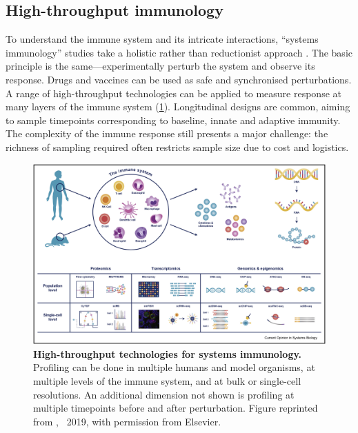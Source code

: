 \begin{outline}
\subsection{High-throughput immunology}

To understand the immune system and its intricate interactions,
\enquote{systems immunology} studies take a holistic rather than reductionist approach \autocite{davis2017SystemsImmunologyJust,villani2018SystemsImmunologyLearning,pulendran2020ScienceMedicineHuman}.
The basic principle is the same---experimentally perturb the system and observe its response.
Drugs and vaccines can be used as safe and synchronised perturbations.
A range of high-throughput technologies can be applied to measure response at many layers of the immune system (\cref{fig:intro_sysImmunology}).
Longitudinal designs are common, aiming to sample timepoints corresponding to baseline, innate and adaptive immunity.
The complexity of the immune response still presents a major challenge:
the richness of sampling required often restricts sample size due to cost and logistics.

\begin{figure}
    \centering
    \includegraphics[width=1.0\textwidth,page=1]{mainmatter/figures/chapter_01/yu2019SystemsImmunologyIntegrating/1-s2.0-S2452310018301197-gr1_lrg.jpg}
    \caption{
        \textbf{High-throughput technologies for systems immunology.}
        Profiling can be done in multiple humans and model organisms, at multiple levels of the immune system, and at bulk or single-cell resolutions.
        An additional dimension not shown is profiling at multiple timepoints before and after perturbation.
        Figure reprinted from \textcite{yu2019SystemsImmunologyIntegrating}, \textcopyright~2019, with permission from Elsevier.
    }
    \label{fig:intro_sysImmunology}
\end{figure}


\end{outline}
